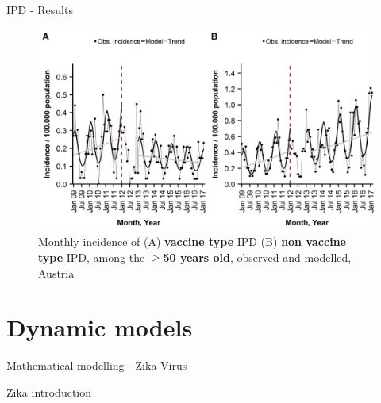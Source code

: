 \documentclass[table]{beamer}\usepackage[]{graphicx}\usepackage[]{color}
\begin{document}
\begin{frame}[fragile]{IPD - Results}
\begin{center}
\begin{figure}
  \centering
  \caption{Monthly incidence of (A) \textbf{vaccine type} IPD (B) \textbf{non vaccine type} IPD, among the \textbf{$\ge$50 years old}, observed and modelled, Austria}
  \includegraphics[width=\textwidth,height=0.5\textheight,keepaspectratio]{richter2019_Fig3.png}
\end{figure}
\end{center}
\vfill
{\scriptsize \cite{richter2019}}
\end{frame}

\section{Dynamic models}

\begin{frame}[fragile]{Mathematical modelling - Zika Virus} %

Zika introduction

\end{frame}
\end{document}
